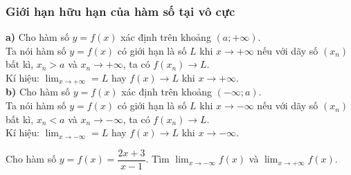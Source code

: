 \subsubsection{Giới hạn hữu hạn của hàm số tại vô cực}
\begin{dn}
\textbf{a)}	Cho hàm số $y = f(x)$ xác định trên khoảng $\left(a; + \infty \right)$. \\
Ta nói hàm số $y = f(x)$ có giới hạn là số $L$ khi $x \rightarrow +\infty$ nếu với dãy số $\left(x_n \right)$ bất kì, $x_n > a$ và $x_n \rightarrow +\infty$, ta có $f\left(x_n \right) \rightarrow L$. \\
Kí hiệu: $\displaystyle \lim_{x \to + \infty} = L$ hay $f(x) \rightarrow L$ khi $x \rightarrow +\infty$. \\
\textbf{b)}	Cho hàm số $y = f(x)$ xác định trên khoảng $\left(-\infty; a \right)$. \\
Ta nói hàm số $y = f(x)$ có giới hạn là số $L$ khi $x \rightarrow - \infty$ nếu với dãy số $\left(x_n \right)$ bất kì, $x_n < a$ và $x_n \rightarrow - \infty$, ta có $ f\left(x_n \right) \rightarrow L$.\\
Kí hiệu: $\displaystyle \lim_{x \to - \infty} = L$ hay $f(x) \rightarrow L$ khi $x \rightarrow -\infty$.
\end{dn}
\begin{vd}%
Cho hàm số $y = f(x) = \dfrac{2x + 3}{x - 1}$. Tìm $\displaystyle \lim_{x \to - \infty}f(x)$ và $\displaystyle \lim_{x \to + \infty}f(x)$.
\end{vd}
